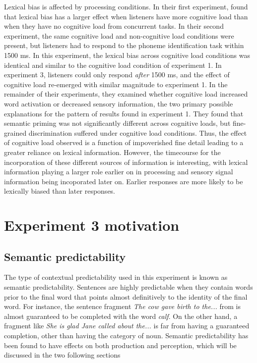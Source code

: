 \documentclass[11pt]{article} %
\begin{document}
Lexical bias is affected by processing conditions.  In their first experiment, \citet{Mattys2011} found that lexical bias has a larger effect when listeners have more cognitive load than when they have no cognitive load from concurrent tasks.  In their second experiment, the same cognitive load and non-cognitive load conditions were present, but listeners had to respond to the phoneme identification task within 1500 ms.  In this experiment, the lexical bias across cognitive load conditions was identical and similar to the cognitive load condition of experiment 1.  In experiment 3, listeners could only respond \emph{after} 1500 ms, and the effect of cognitive load re-emerged with similar magnitude to experiment 1.  In the remainder of their experiments, they examined whether cognitive load increased word activation or decreased sensory information, the two primary possible explanations for the pattern of results found in experiment 1.  They found that semantic priming was not significantly different across cognitive loads, but fine-grained discrimination suffered under cognitive load conditions.  Thus, the effect of cognitive load observed is a function of impoverished fine detail leading to a greater reliance on lexical information.  However, the timecourse for the incorporation of these different sources of information is interesting, with lexical information playing a larger role earlier on in processing and sensory signal information being incoporated later on.  Earlier responses are more likely to be lexically biased than later responses.

\section{Experiment 3 motivation}

\subsection{Semantic predictability}

The type of contextual predictability used in this experiment is known as semantic predictability.  Sentences are highly predictable when they contain words prior to the final word that points almost definitively to the identity of the final word.  For instance, the sentence fragment \emph{The cow gave birth to the...} from \citet{Kalikow1977} is almost guaranteed to be completed with the word \emph{calf}.  On the other hand, a fragment like \emph{She is glad Jane called about the...} is far from having a guaranteed completion, other than having the category of noun. Semantic predictability has been found to have effects on both production and perception, which will be discussed in the two following sections
\end{document}
